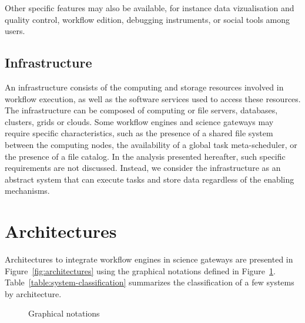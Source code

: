\documentclass[preprint,3p,twocolumn]{elsarticle}
\begin{document}
Other specific features may also be available, for instance
data vizualisation and quality control, workflow edition, debugging
instruments, or social tools among users. 

\subsection{Infrastructure}

An infrastructure consists of the computing and storage
resources involved in workflow execution, as well as the software
services used to access these resources. The infrastructure can be
composed of computing or file servers, databases, clusters, grids or
clouds. Some workflow engines and science gateways may require specific
characteristics, such as the presence of a shared file system between
the computing nodes, the availability of a global task meta-scheduler, or
the presence of a file catalog. In the analysis presented hereafter,
such specific requirements are not discussed. Instead, we consider the
infrastructure as an abstract system that can execute tasks and store
data regardless of the enabling mechanisms.

\section{Architectures}
\label{sec:architectures}


Architectures to integrate workflow engines in science gateways are
presented in Figure~\ref{fig:architectures} using the graphical
notations defined in
Figure~\ref{fig:notations}. Table~\ref{table:system-classification}
summarizes the classification of a few systems by architecture.


\begin{figure}
\centering
\def\svgwidth{0.8\columnwidth}

\caption{Graphical notations}
\label{fig:notations}
\end{figure}
\end{document}
